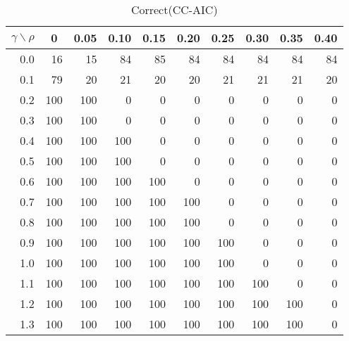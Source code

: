 \documentclass[12pt]{article}
\begin{document}
\begin{table}[!tbp]
\caption{Correct(CC-AIC)}
 \begin{center}
 \begin{tabular}{r|rrrrrrrrr}\hline\hline
\multicolumn{1}{c|}{$\gamma\backslash\rho$}&\multicolumn{1}{c}{0}&\multicolumn{1}{c}{0.05}&\multicolumn{1}{c}{0.10}&\multicolumn{1}{c}{0.15}&\multicolumn{1}{c}{0.20}&\multicolumn{1}{c}{0.25}&\multicolumn{1}{c}{0.30}&\multicolumn{1}{c}{0.35}&\multicolumn{1}{c}{0.40}\tabularnewline
\hline




0.0& 16& 15& 84& 85& 84& 84& 84& 84&84\tabularnewline
0.1& 79& 20& 21& 20& 20& 21& 21& 21&20\tabularnewline
0.2&100&100&  0&  0&  0&  0&  0&  0& 0\tabularnewline
0.3&100&100&  0&  0&  0&  0&  0&  0& 0\tabularnewline
0.4&100&100&100&  0&  0&  0&  0&  0& 0\tabularnewline
0.5&100&100&100&  0&  0&  0&  0&  0& 0\tabularnewline
0.6&100&100&100&100&  0&  0&  0&  0& 0\tabularnewline
0.7&100&100&100&100&100&  0&  0&  0& 0\tabularnewline
0.8&100&100&100&100&100&  0&  0&  0& 0\tabularnewline
0.9&100&100&100&100&100&100&  0&  0& 0\tabularnewline
1.0&100&100&100&100&100&100&  0&  0& 0\tabularnewline
1.1&100&100&100&100&100&100&100&  0& 0\tabularnewline
1.2&100&100&100&100&100&100&100&100& 0\tabularnewline
1.3&100&100&100&100&100&100&100&100& 0\tabularnewline
\hline
\end{tabular}

\end{center}

\end{table}

%
\end{document}
